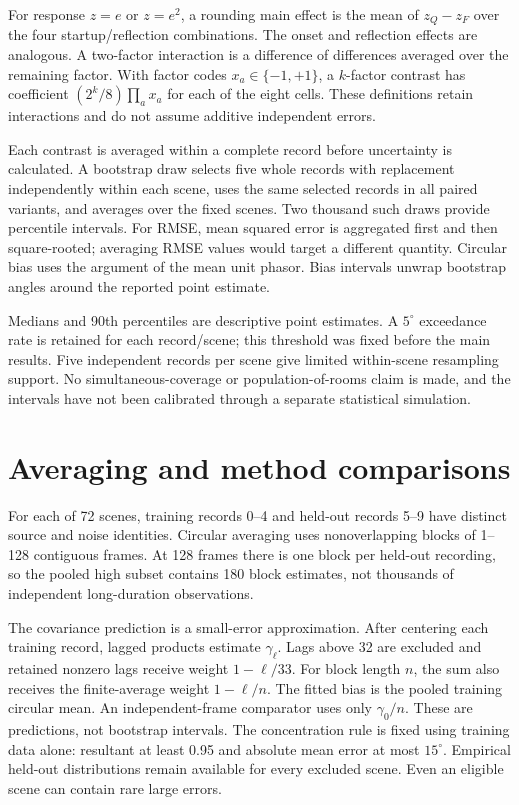 \documentclass[10pt,a4paper]{article}
\begin{document}
For response $z=e$ or $z=e^2$, a rounding main effect is the mean of $z_Q-z_F$ over the four startup/reflection combinations. The onset and reflection effects are analogous. A two-factor interaction is a difference of differences averaged over the remaining factor. With factor codes $x_a\in\{-1,+1\}$, a $k$-factor contrast has coefficient $(2^k/8)\prod_a x_a$ for each of the eight cells. These definitions retain interactions and do not assume additive independent errors.



Each contrast is averaged within a complete record before uncertainty is calculated. A bootstrap draw selects five whole records with replacement independently within each scene, uses the same selected records in all paired variants, and averages over the fixed scenes. Two thousand such draws provide percentile intervals. For RMSE, mean squared error is aggregated first and then square-rooted; averaging RMSE values would target a different quantity. Circular bias uses the argument of the mean unit phasor. Bias intervals unwrap bootstrap angles around the reported point estimate.

Medians and 90th percentiles are descriptive point estimates. A $5^\circ$ exceedance rate is retained for each record/scene; this threshold was fixed before the main results. Five independent records per scene give limited within-scene resampling support. No simultaneous-coverage or population-of-rooms claim is made, and the intervals have not been calibrated through a separate statistical simulation.

\section{Averaging and method comparisons}
For each of 72 scenes, training records 0--4 and held-out records 5--9 have distinct source and noise identities. Circular averaging uses nonoverlapping blocks of 1--128 contiguous frames. At 128 frames there is one block per held-out recording, so the pooled high subset contains 180 block estimates, not thousands of independent long-duration observations.

The covariance prediction is a small-error approximation. After centering each training record, lagged products estimate $\gamma_\ell$. Lags above 32 are excluded and retained nonzero lags receive weight $1-\ell/33$. For block length $n$, the sum also receives the finite-average weight $1-\ell/n$. The fitted bias is the pooled training circular mean. An independent-frame comparator uses only $\gamma_0/n$. These are predictions, not bootstrap intervals. The concentration rule is fixed using training data alone: resultant at least 0.95 and absolute mean error at most $15^\circ$. Empirical held-out distributions remain available for every excluded scene. Even an eligible scene can contain rare large errors.
\end{document}
